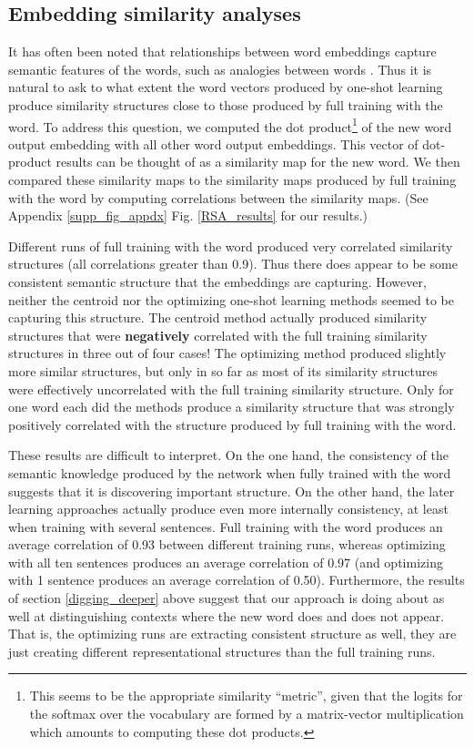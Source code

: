 \documentclass{article}
\begin{document}
\subsection{Embedding similarity analyses}
It has often been noted that relationships between word embeddings capture semantic features of the words, such as analogies between words \citep{Mikolov2013}. Thus it is natural to ask to what extent the word vectors produced by one-shot learning produce similarity structures close to those produced by full training with the word. To address this question, we computed the dot product\footnote{This seems to be the appropriate similarity ``metric'', given that the logits for the softmax over the vocabulary are formed by a matrix-vector multiplication which amounts to computing these dot products.} of the new word output embedding with all other word output embeddings. This vector of dot-product results can be thought of as a similarity map for the new word. We then compared these similarity maps to the similarity maps produced by full training with the word by computing correlations between the similarity maps. (See Appendix \ref{supp_fig_appdx} Fig. \ref{RSA_results} for our results.)\par
Different runs of full training with the word produced very correlated similarity structures (all correlations greater than 0.9). Thus there does appear to be some consistent semantic structure that the embeddings are capturing. However, neither the centroid nor the optimizing one-shot learning methods seemed to be capturing this structure. The centroid method actually produced similarity structures that were \textbf{negatively} correlated with the full training similarity structures in three out of four cases! The optimizing method produced slightly more similar structures, but only in so far as most of its similarity structures were effectively uncorrelated with the full training similarity structure. Only for one word each did the methods produce a similarity structure that was strongly positively correlated with the structure produced by full training with the word. \par
These results are difficult to interpret. On the one hand, the consistency of the semantic knowledge produced by the network when fully trained with the word suggests that it is discovering important structure. On the other hand, the later learning approaches actually produce even more internally consistency, at least when training with several sentences. Full training with the word produces an average correlation of 0.93 between different training runs, whereas optimizing with all ten sentences produces an average correlation of 0.97 (and optimizing with 1 sentence produces an average correlation of 0.50). Furthermore, the results of section \ref{digging_deeper} above suggest that our approach is doing about as well at distinguishing contexts where the new word does and does not appear. That is, the optimizing runs are extracting consistent structure as well, they are just creating different representational structures than the full training runs. \par
\end{document}
